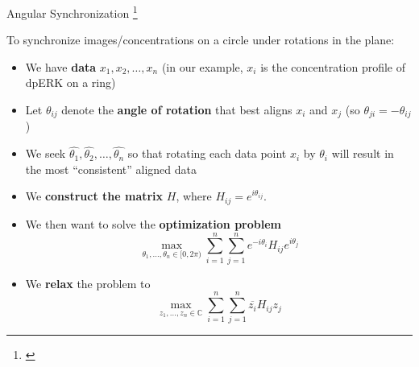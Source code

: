 \begin{frame}{Angular Synchronization \let\thefootnote\relax\footnote{\cite{singer2011angular}}}

	To synchronize images/concentrations on a circle under rotations in the plane:
    {\scriptsize
    \begin{itemize}
        \item We have {\bf data} $x_1, x_2, \dots, x_n$ (in our example, $x_i$ is the concentration profile of dpERK on a ring)


        \item Let $\theta_{ij}$ denote the {\bf angle of rotation} that best aligns $x_i$ and $x_j$ (so $\theta_{ji} = -\theta_{ij}$)

        \item We seek $\hat{\theta_1}, \hat{\theta_2}, \dots, \hat{\theta_n}$ so that rotating each data point $x_i$ by $\theta_i$ will result in the most ``consistent'' aligned data

        \item We {\bf construct the matrix} $H$, where $H_{ij} = e^{i \theta_{ij}}$.

        \item We then want to solve the {\bf optimization problem}
        $$ \max_{\theta_1, \dots, \theta_n \in [0, 2\pi)} \sum_{i=1}^{n}\sum_{j=1}^{n} e^{-i \theta_i}H_{ij} e^{i \theta_j}$$




        \item We {\bf relax} the problem to
        $$\max_{z_1, \dots, z_n \in \mathbb{C}} \sum_{i=1}^{n}\sum_{j=1}^{n} \overline{z_i} H_{ij} z_j $$


\end{itemize}}
\end{frame}
